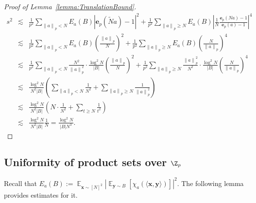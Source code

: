 \documentclass{toc}
\DeclareMathOperator{\Ex}{{\mathbb E}}
\newcommand{\e}{\mathbf{e}}
\newcommand{\x}{\mathbf{x}}
\newcommand{\y}{\mathbf{y}}
\newcommand{\ip}[1]{\langle #1 \rangle}
\newcommand{\norm}[1]{\left\| #1 \right\|_p}
\begin{document}
\begin{proof}[Proof of Lemma~\ref{lemma:TranslationBound}]
\begin{eqnarray*}
	 s^2 & \lesssim &\frac{1}{p^2} \sum_{\norm{a} < N} E_a(B)  |\e_p(\tilde{N}a)-1|^2  + \frac{1}{p^2}\sum_{\norm{a} \ge N}    E_a(B)  \left|\frac{1}{N} \frac{\e_p(Na)-1}{\e_p(a)-1}\right|^4 \\
& \lesssim &\frac{1}{p^2} \sum_{\norm{a} < N}  E_a(B) \left(\frac{\norm{a}}{N} \right)^2  + \frac{1}{p^2}\sum_{\norm{a} \ge N}     E_a(B) \left(\frac{N}{\norm{a}} \right)^4  \\
&\lesssim& \frac{1}{p^2} \sum_{\norm{a} < N}  \frac{N^2}{\norm{a}^2} \cdot \frac{\log^2 N}{|B|}   \left(\frac{ \norm{a}}{N} \right)^2 +  \frac{1}{p^2} \sum_{\norm{a} \ge N}  \frac{\norm{a}^2}{N^2} \cdot \frac{\log^2 N}{|B|}  \left(\frac{N}{ \norm{a}} \right)^4   \\
	 &\lesssim&\frac{\log^2 N }{N^2|B|}  \left( \sum_{\norm{a} < N}  \frac{1}{N^2} +  \sum_{\norm{a} \ge N}   \frac{ 1}{\norm{a}^2} \right) \\
	 &\lesssim&\frac{\log^2 N }{N^2|B|}  \left( N \cdot  \frac{1}{N^2} +  \sum_{t \ge N}  \frac{1 }{t^2} \right) \\
&\lesssim & \frac{\log^2 N}{N^2|B|} \frac{1}{N} = \frac{ \log^2 N}{|B|N^3}.
\end{eqnarray*}
 \end{proof}

\subsection{Uniformity of product sets over $\Z_p$}
Recall that $ E_a(B) :=   \Ex_{\x \sim [N]^2}  \left|\Ex_{\y \sim B}   \left[ \chi_a(\ip{\x,\y})\right]\right|^2$. The following
lemma provides estimates for it.
\end{document}
